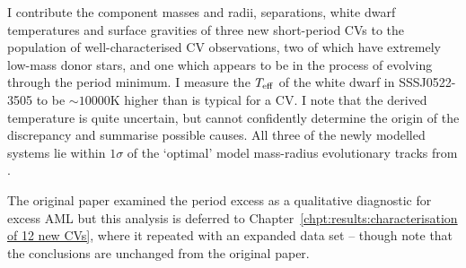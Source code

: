 I contribute the component masses and radii, separations, white dwarf temperatures and surface gravities of three new short-period CVs to the population of well-characterised CV observations, two of which have extremely low-mass donor stars, and one which appears to be in the process of evolving through the period minimum.
I measure the $T_{\rm eff}$ of the white dwarf in SSSJ0522-3505 to be $\sim10000$K higher than is typical for a CV. I note that the derived temperature is quite uncertain, but cannot confidently determine the origin of the discrepancy and summarise possible causes.
All three of the newly modelled systems lie within $1\sigma$ of the `optimal' model mass-radius evolutionary tracks from \citet{knigge11}.

The original paper \citep{wild2021} examined the period excess as a qualitative diagnostic for excess AML but this analysis is deferred to Chapter~\ref{chpt:results:characterisation of 12 new CVs}, where it repeated with an expanded data set -- though note that the conclusions are unchanged from the original paper.
